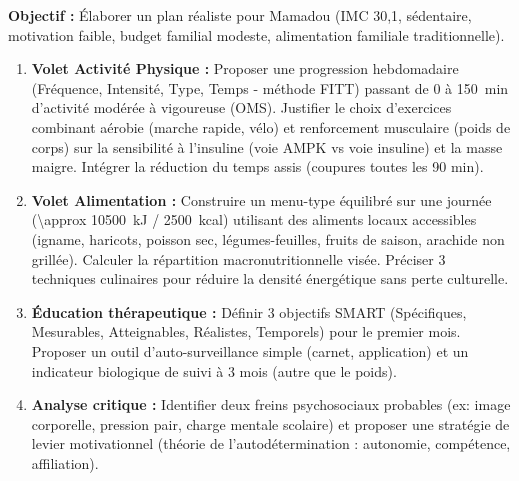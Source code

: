 \documentclass[11pt]{article}
\begin{document}
\begin{exercice}
\textbf{Objectif :} Élaborer un plan réaliste pour Mamadou (IMC 30,1, sédentaire, motivation faible, budget familial modeste, alimentation familiale traditionnelle).
\begin{enumerate}
    \item \textbf{Volet Activité Physique :} Proposer une progression hebdomadaire (Fréquence, Intensité, Type, Temps - méthode FITT) passant de 0 à \SI{150}{min} d'activité modérée à vigoureuse (OMS). Justifier le choix d'exercices combinant aérobie (marche rapide, vélo) et renforcement musculaire (poids de corps) sur la sensibilité à l'insuline (voie AMPK vs voie insuline) et la masse maigre. Intégrer la réduction du temps assis (coupures toutes les 90 min).
    \item \textbf{Volet Alimentation :} Construire un menu-type équilibré sur une journée (\SI{\approx 10500}{kJ} / \SI{2500}{kcal}) utilisant des aliments locaux accessibles (igname, haricots, poisson sec, légumes-feuilles, fruits de saison, arachide non grillée). Calculer la répartition macronutritionnelle visée. Préciser 3 techniques culinaires pour réduire la densité énergétique sans perte culturelle.
    \item \textbf{Éducation thérapeutique :} Définir 3 objectifs SMART (Spécifiques, Mesurables, Atteignables, Réalistes, Temporels) pour le premier mois. Proposer un outil d'auto-surveillance simple (carnet, application) et un indicateur biologique de suivi à 3 mois (autre que le poids).
    \item \textbf{Analyse critique :} Identifier deux freins psychosociaux probables (ex: image corporelle, pression pair, charge mentale scolaire) et proposer une stratégie de levier motivationnel (théorie de l'autodétermination : autonomie, compétence, affiliation).
\end{enumerate}
\end{exercice}
\end{document}
